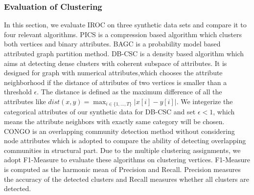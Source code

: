 
\subsubsection{Evaluation of Clustering}
In this section, we evaluate IROC on three synthetic data sets and compare it to four relevant algorithms. PICS \cite{DBLP:conf/sdm/AkogluTMF12} is a compression based algorithm which clusters both vertices and binary attributes. BAGC \cite{DBLP:conf/sigmod/XuKWCC12} is a probability model based attributed graph partition method. DB-CSC \cite{DBLP:conf/pkdd/GunnemannBS11} is a density based algorithm which aims at detecting dense clusters with coherent subspace of attributes. It is designed for graph with numerical attributes,which chooses the attribute neighborhood if the distance of attributes of two vertices is smaller than a threshold $\epsilon$. The distance is defined as the maximum difference of all the attributes like $dist(x,y) = \max_{i\in\{1,...,T\} } |x[i]-y[i]|$. We integerize the categorical attributes of our synthetic data for DB-CSC and set $\epsilon < 1$, which means the attribute neighbors with exactly same category will be chosen. CONGO is an overlapping community detection method without considering node attributes which is adopted to compare the ability of detecting overlapping communities in structural part. Due to the multiple clustering assignments, we adopt F1-Measure to evaluate these algorithms on clustering vertices. F1-Measure is computed as the harmonic mean of Precision and Recall. Precision measures the accuracy of the detected clusters and Recall measures whether all clusters are detected.

